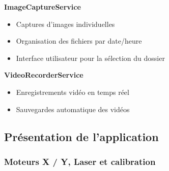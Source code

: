 \textbf{ImageCaptureService}
\begin{itemize}[label=\textbullet]
    \item Captures d'images individuelles
    \item Organisation des fichiers par date/heure
    \item Interface utilisateur pour la sélection du dossier
\end{itemize}

\textbf{VideoRecorderService}
\begin{itemize}[label=\textbullet]
    \item Enregistrements vidéo en temps réel
    \item Sauvegardes automatique des vidéos
\end{itemize}

\newpage
\subsection{Présentation de l'application} \label{subsection:fenetres}
\subsubsection{Moteurs X / Y, Laser et calibration}

